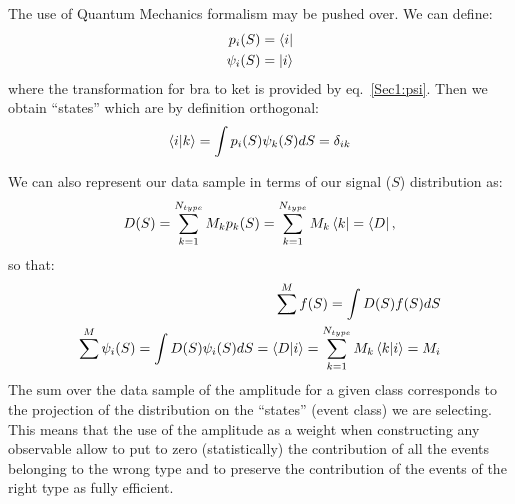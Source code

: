 The use of Quantum Mechanics formalism may be pushed over.
We can define:
\begin{eqnarray}
\label{Sec1:QMdef1}
p_{i}(S) = \bra{i} \\
\psi_{i}(S) = \ket{i}
\end{eqnarray}
where the transformation for bra to ket is provided by eq.~\ref{Sec1:psi}.
Then we obtain ``states'' which are by definition orthogonal:
\begin{equation}
\label{Sec1:Orto}
\braket{i|k} = \int p_{i}(S) \psi_{k}(S) dS = \delta_{ik}
\end{equation}

We can also represent our data sample in terms of our signal ($S$)
distribution as:
\begin{equation}
\label{Sec1:DataSample}
D(S) = \sum\limits_{k=1}^{N_{type}} M_{k} p_{k}(S) = 
\sum\limits_{k=1}^{N_{type}}M_{k}\bra{k} = \bra{D},
\end{equation}
so that:
\begin{eqnarray}
\label{Sec1:Distribution}
\sum\limits^{M} f(S) = \int D(S) f(S) dS \\
\sum\limits^{M} \psi_{i}(S) = \int D(S) \psi_{i}(S) dS = \braket{D|i} = \sum\limits_{k=1}^{N_{type}}M_{k}\braket{k|i}=M_{i}
\end{eqnarray}
The sum over the data sample of the amplitude for a given class corresponds to
the projection of the distribution on the ``states'' (event class) we are
selecting. This means that the use of the amplitude as a weight when
constructing any observable allow to put to zero (statistically) the contribution of all the
events belonging to the wrong type and to preserve the contribution of the
events of the right type as fully efficient.
